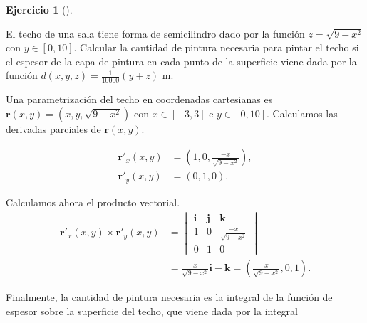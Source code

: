 \documentclass[
  spanish,
  a4paper,
]{scrreport}
\theoremstyle{definition}
\newtheorem{exercise}{Ejercicio}[chapter]
\theoremstyle{remark}
\begin{document}
\begin{exercise}[]\protect\hypertarget{exr-pintura-techo}{}\label{exr-pintura-techo}

El techo de una sala tiene forma de semicilindro dado por la función
\(z=\sqrt{9-x^2}\) con \(y\in[0,10]\). Calcular la cantidad de pintura
necesaria para pintar el techo si el espesor de la capa de pintura en
cada punto de la superficie viene dada por la función
\(d(x,y,z) = \frac{1}{10000}(y + z)\) m.

\end{exercise}

\begin{tcolorbox}[enhanced jigsaw, arc=.35mm, bottomrule=.15mm, bottomtitle=1mm, breakable, colback=white, colbacktitle=quarto-callout-tip-color!10!white, colframe=quarto-callout-tip-color-frame, coltitle=black, left=2mm, leftrule=.75mm, opacityback=0, opacitybacktitle=0.6, rightrule=.15mm, title=\textcolor{quarto-callout-tip-color}{\faLightbulb}\hspace{0.5em}{Solución}, titlerule=0mm, toprule=.15mm, toptitle=1mm]

Una parametrización del techo en coordenadas cartesianas es
\(\mathbf{r}(x,y) = (x, y, \sqrt{9-x^2})\) con \(x\in[-3,3]\) e
\(y\in[0,10]\). Calculamos las derivadas parciales de
\(\mathbf{r}(x,y)\).

\begin{align*}
\mathbf{r}'_x(x,y) &= (1, 0, \frac{-x}{\sqrt{9-x^2}}), \\
\mathbf{r}'_y(x,y) &= (0, 1, 0).
\end{align*}

Calculamos ahora el producto vectorial. \begin{align*}
\mathbf{r}'_x(x,y) \times \mathbf{r}'_y(x,y)
&= \begin{vmatrix}
\mathbf{i} & \mathbf{j} & \mathbf{k} \\
1 & 0 & \frac{-x}{\sqrt{9-x^2}} \\
0 & 1 & 0
\end{vmatrix} \\
&= \frac{x}{\sqrt{9-x^2}}\mathbf{i} - \mathbf{k}
= \left(\frac{x}{\sqrt{9-x^2}}, 0, 1\right).
\end{align*}

Finalmente, la cantidad de pintura necesaria es la integral de la
función de espesor sobre la superficie del techo, que viene dada por la
integral


\end{tcolorbox}
\end{document}
